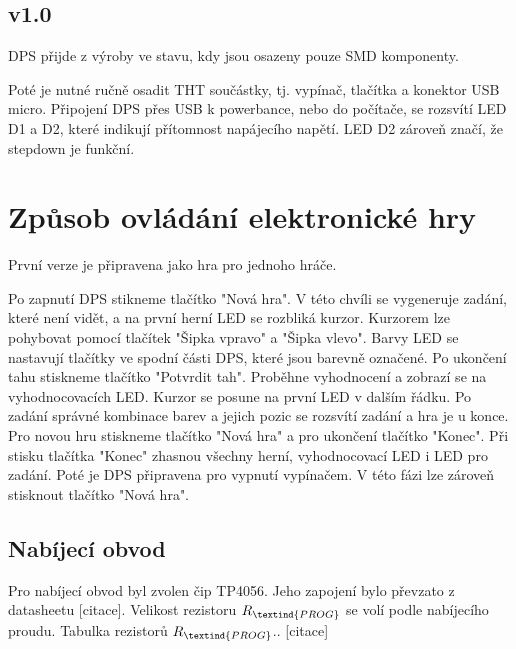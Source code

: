 \section{v1.0}
DPS přijde z výroby ve stavu, kdy jsou osazeny pouze SMD komponenty. %

Poté je nutné ručně osadit THT součástky, tj. vypínač, tlačítka a konektor USB micro. Připojení DPS přes USB k powerbance, 
nebo do počítače, se rozsvítí LED D1 a D2, které indikují přítomnost napájecího napětí. LED D2 zároveň značí, že stepdown je 
funkční.

\chapter{Způsob ovládání elektronické hry}
První verze je připravena jako hra pro jednoho hráče.

Po zapnutí DPS stikneme tlačítko "Nová hra". V této chvíli se vygeneruje zadání, které není vidět,
a na první herní LED se rozbliká kurzor. 
Kurzorem lze pohybovat pomocí tlačítek "Šipka vpravo" a "Šipka vlevo". Barvy LED se nastavují tlačítky ve spodní části DPS,
které jsou barevně označené. 
Po ukončení tahu stiskneme tlačítko "Potvrdit tah". Proběhne vyhodnocení a zobrazí se na vyhodnocovacích LED. Kurzor se posune
na první LED v dalším řádku.
Po zadání správné kombinace barev a jejich pozic se rozsvítí zadání a hra je u konce. Pro novou hru stiskneme tlačítko
"Nová hra" a pro ukončení tlačítko "Konec".
Při stisku tlačítka "Konec" zhasnou všechny herní, vyhodnocovací LED i LED pro zadání. Poté je DPS připravena pro vypnutí
vypínačem. V této fázi lze zároveň stisknout tlačítko "Nová hra". 













\section{Nabíjecí obvod}
Pro nabíjecí obvod byl zvolen čip TP4056. Jeho zapojení bylo převzato z datasheetu [citace]. %
Velikost rezistoru $R_\textind{PROG}$ se volí podle nabíjecího proudu. 
Tabulka rezistorů $R_\textind{PROG}$.. [citace]

